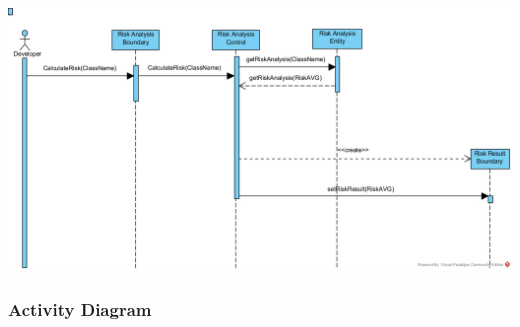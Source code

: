\documentclass[11pt]{article}
\begin{document}
    		\includegraphics[width=\columnwidth]{LP_RiskAnalysis.png}
	 
	  \flushleft
		\subsubsection{Activity Diagram}
		
\end{document}
